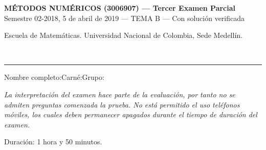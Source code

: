 \documentclass[11pt]{article}
\newcommand{\examheader}{%
  \noindent
  \begin{minipage}[t]{0.6\linewidth}
    {\small\bfseries MÉTODOS NUMÉRICOS (3006907) --- Tercer Examen Parcial}\\
    {\small Semestre 02-2018, 5 de abril de 2019 --- TEMA B --- Con solución verificada}
  \end{minipage}%
  \hfill
  \begin{minipage}[t]{0.35\linewidth}
    \raggedleft\small Escuela de Matemáticas. Universidad Nacional de Colombia, Sede Medellín.
  \end{minipage}\\[2pt]
  \rule{\linewidth}{0.6pt}
}
\begin{document}
\examheader

\vspace{4pt}
\noindent Nombre completo:\underline{\hspace{7.5cm}}\quad Carné:\underline{\hspace{2.5cm}}\quad Grupo:\underline{\hspace{1.5cm}}

\vspace{6pt}
\noindent\textit{La interpretación del examen hace parte de la evaluación, por tanto no se admiten preguntas comenzada la prueba. No está permitido el uso teléfonos móviles, los cuales deben permanecer apagados durante el tiempo de duración del examen.}

\vspace{6pt}
\noindent{}

\vspace{4pt}
\noindent Duración: 1 hora y 50 minutos.

\vspace{10pt}
\end{document}
